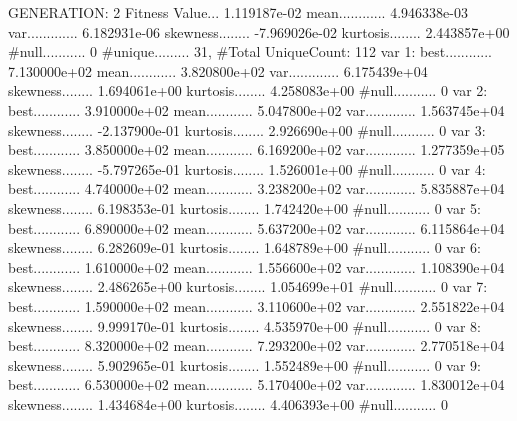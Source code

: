 \documentclass[oneside,letterpaper,titlepage]{article}
\begin{document}
\begin{Schunk}
\begin{Soutput}
GENERATION: 2
Fitness Value... 1.119187e-02
mean............ 4.946338e-03
var............. 6.182931e-06
skewness........ -7.969026e-02
kurtosis........ 2.443857e+00
#null........... 0
#unique......... 31, #Total UniqueCount: 112
var 1:
best............ 7.130000e+02
mean............ 3.820800e+02
var............. 6.175439e+04
skewness........ 1.694061e+00
kurtosis........ 4.258083e+00
#null........... 0
var 2:
best............ 3.910000e+02
mean............ 5.047800e+02
var............. 1.563745e+04
skewness........ -2.137900e-01
kurtosis........ 2.926690e+00
#null........... 0
var 3:
best............ 3.850000e+02
mean............ 6.169200e+02
var............. 1.277359e+05
skewness........ -5.797265e-01
kurtosis........ 1.526001e+00
#null........... 0
var 4:
best............ 4.740000e+02
mean............ 3.238200e+02
var............. 5.835887e+04
skewness........ 6.198353e-01
kurtosis........ 1.742420e+00
#null........... 0
var 5:
best............ 6.890000e+02
mean............ 5.637200e+02
var............. 6.115864e+04
skewness........ 6.282609e-01
kurtosis........ 1.648789e+00
#null........... 0
var 6:
best............ 1.610000e+02
mean............ 1.556600e+02
var............. 1.108390e+04
skewness........ 2.486265e+00
kurtosis........ 1.054699e+01
#null........... 0
var 7:
best............ 1.590000e+02
mean............ 3.110600e+02
var............. 2.551822e+04
skewness........ 9.999170e-01
kurtosis........ 4.535970e+00
#null........... 0
var 8:
best............ 8.320000e+02
mean............ 7.293200e+02
var............. 2.770518e+04
skewness........ 5.902965e-01
kurtosis........ 1.552489e+00
#null........... 0
var 9:
best............ 6.530000e+02
mean............ 5.170400e+02
var............. 1.830012e+04
skewness........ 1.434684e+00
kurtosis........ 4.406393e+00
#null........... 0


\end{Soutput}
\end{Schunk}
\end{document}
